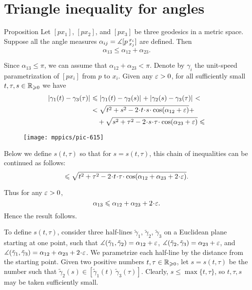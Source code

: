 \section{Triangle inequality for angles}

\begin{thm}{Proposition}
\label{claim:angle-3angle-inq}
Let  $[px_1]$, $[px_2]$, and $[px_3]$ be three geodesics in a metric space.
Suppose all the angle measures $\alpha_{i j}=\measuredangle[p\,{}^{x_i}_{x_j}]$ are defined.
Then 
\[\alpha_{13}\le \alpha_{12}+\alpha_{23}.\]

\end{thm}

Since $\alpha_{13}\le\pi$, we can assume that $\alpha_{12}+\alpha_{23}< \pi$.
Denote by $\gamma_i$ the unit-speed parametrization of $[px_i]$ from $p$ to $x_i$.
Given any $\varepsilon>0$, for all sufficiently small $t,\tau,s\in\mathbb{R}_{\geqslant0}$ we have
\begin{align*}
\dist{\gamma_1(t)}{\gamma_3(\tau)}{}
&\le 
\dist{\gamma_1(t)}{\gamma_2(s)}{}+\dist{\gamma_2(s)}{\gamma_3(\tau)}{}<\\
&<
\sqrt{t^2+s^2-2\cdot t\cdot  s\cdot \cos(\alpha_{12}+\eps)} +
\\
&\quad+\sqrt{s^2+\tau^2-2\cdot s\cdot \tau\cdot \cos(\alpha_{23}+\eps)}\le
\end{align*}

\begin{wrapfigure}{o}{30 mm}
\vskip-6mm
\centering
\texttt{[image: mppics/pic-615]}
\vskip3mm
\end{wrapfigure}

Below we define 
$s(t,\tau)$ so that for 
$s=s(t,\tau)$, this chain of inequalities can be continued as follows:
\[\le
\sqrt{t^2+\tau^2-2\cdot t\cdot \tau\cdot \cos(\alpha_{12}+\alpha_{23}+2\cdot \eps)}.
\]

Thus for any $\varepsilon>0$, 
\[\alpha_{13}\le \alpha_{12}+\alpha_{23}+2\cdot \eps.\]
Hence the result follows.

To define $s(t,\tau)$, consider three half-lines $\tilde \gamma_1$, $\tilde \gamma_2$, $\tilde \gamma_3$ on a Euclidean plane starting at one point, such that
$\mangle(\tilde \gamma_1,\tilde \gamma_2)\z=\alpha_{12}+\eps$,
$\mangle(\tilde \gamma_2,\tilde \gamma_3)\z=\alpha_{23}+\eps$,
and $\mangle(\tilde \gamma_1,\tilde \gamma_3)\z=\alpha_{12}\z+\alpha_{23}\z+2\cdot \eps$.
We parametrize each half-line by the distance from the starting point.
Given two positive numbers $t,\tau\in\mathbb{R}_{\geqslant0}$, let $s=s(t,\tau)$ be 
the number such that 
$\tilde \gamma_2(s)\in[\tilde \gamma_1(t)\ \tilde \gamma_3(\tau)]$. 
Clearly, $s\le\max\{t,\tau\}$, so $t,\tau,s$ may be taken sufficiently small.
\qeds 

